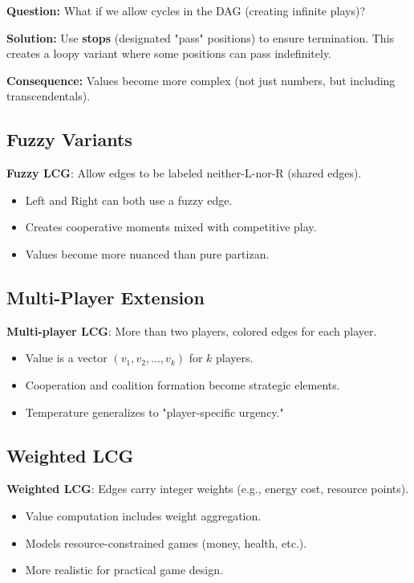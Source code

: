 \documentclass[10pt,a4paper,twocolumn]{article}
\theoremstyle{plain}
\theoremstyle{definition}
\theoremstyle{remark}
\begin{document}
\textbf{Question:} What if we allow cycles in the DAG (creating infinite plays)?

\textbf{Solution:} Use \textbf{stops} (designated "pass" positions) to ensure termination. This creates a loopy variant where some positions can pass indefinitely.

\textbf{Consequence:} Values become more complex (not just numbers, but including transcendentals).

\subsection{Fuzzy Variants}

\textbf{Fuzzy LCG}: Allow edges to be labeled neither-L-nor-R (shared edges).

\begin{itemize}
\item Left and Right can both use a fuzzy edge.
\item Creates cooperative moments mixed with competitive play.
\item Values become more nuanced than pure partizan.
\end{itemize}

\subsection{Multi-Player Extension}

\textbf{Multi-player LCG}: More than two players, colored edges for each player.

\begin{itemize}
\item Value is a vector $(v_1, v_2, \ldots, v_k)$ for $k$ players.
\item Cooperation and coalition formation become strategic elements.
\item Temperature generalizes to "player-specific urgency."
\end{itemize}

\subsection{Weighted LCG}

\textbf{Weighted LCG}: Edges carry integer weights (e.g., energy cost, resource points).

\begin{itemize}
\item Value computation includes weight aggregation.
\item Models resource-constrained games (money, health, etc.).
\item More realistic for practical game design.
\end{itemize}
\end{document}
